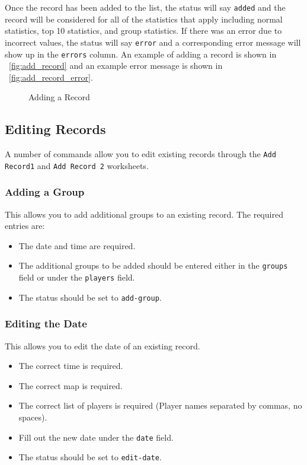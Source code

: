 Once the record has been added to the list, the status will say \texttt{added} and the record will be considered for all of the statistics that apply including normal statistics, top 10 statistics, and group statistics. If there was an error due to incorrect values, the status will say \texttt{error} and a corresponding error message will show up in the \texttt{errors} column. An example of adding a record is shown in \figurename\ \ref{fig:add_record} and an example error message is shown in \figurename\ \ref{fig:add_record_error}.
\begin{figure}[htb!]
\centering
{}
\caption{Adding a Record}
\end{figure}

\subsection{Editing Records}
A number of commands allow you to edit existing records through the \texttt{Add Record1} and \texttt{Add Record 2} worksheets.

\subsubsection{Adding a Group}
This allows you to add additional groups to an existing record. The required entries are:
\begin{itemize}
\item The date and time are required.
\item The additional groups to be added should be entered either in the \texttt{groups} field or under the \texttt{players} field.
\item The status should be set to \texttt{add-group}.
\end{itemize}

\subsubsection{Editing the Date}
This allows you to edit the date of an existing record.
\begin{itemize}
\item The correct time is required.
\item The correct map is required.
\item The correct list of players is required (Player names separated by commas, no spaces).
\item Fill out the new date under the \texttt{date} field.
\item The status should be set to \texttt{edit-date}.
\end{itemize}

